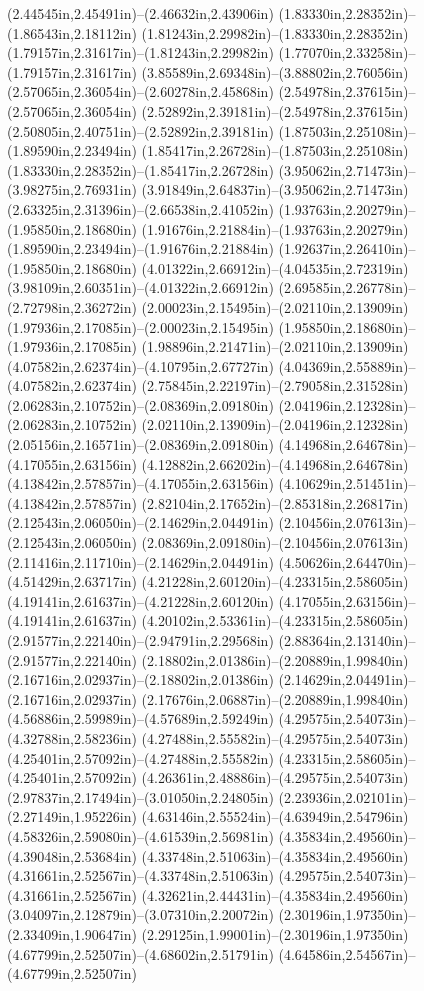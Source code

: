 (2.44545in,2.45491in)--(2.46632in,2.43906in) (1.83330in,2.28352in)--(1.86543in,2.18112in) (1.81243in,2.29982in)--(1.83330in,2.28352in) (1.79157in,2.31617in)--(1.81243in,2.29982in) (1.77070in,2.33258in)--(1.79157in,2.31617in) (3.85589in,2.69348in)--(3.88802in,2.76056in) (2.57065in,2.36054in)--(2.60278in,2.45868in) (2.54978in,2.37615in)--(2.57065in,2.36054in) (2.52892in,2.39181in)--(2.54978in,2.37615in) (2.50805in,2.40751in)--(2.52892in,2.39181in) (1.87503in,2.25108in)--(1.89590in,2.23494in) (1.85417in,2.26728in)--(1.87503in,2.25108in) (1.83330in,2.28352in)--(1.85417in,2.26728in) (3.95062in,2.71473in)--(3.98275in,2.76931in) (3.91849in,2.64837in)--(3.95062in,2.71473in) (2.63325in,2.31396in)--(2.66538in,2.41052in) (1.93763in,2.20279in)--(1.95850in,2.18680in) (1.91676in,2.21884in)--(1.93763in,2.20279in) (1.89590in,2.23494in)--(1.91676in,2.21884in) (1.92637in,2.26410in)--(1.95850in,2.18680in) (4.01322in,2.66912in)--(4.04535in,2.72319in) (3.98109in,2.60351in)--(4.01322in,2.66912in) (2.69585in,2.26778in)--(2.72798in,2.36272in) (2.00023in,2.15495in)--(2.02110in,2.13909in) (1.97936in,2.17085in)--(2.00023in,2.15495in) (1.95850in,2.18680in)--(1.97936in,2.17085in) (1.98896in,2.21471in)--(2.02110in,2.13909in) (4.07582in,2.62374in)--(4.10795in,2.67727in) (4.04369in,2.55889in)--(4.07582in,2.62374in) (2.75845in,2.22197in)--(2.79058in,2.31528in) (2.06283in,2.10752in)--(2.08369in,2.09180in) (2.04196in,2.12328in)--(2.06283in,2.10752in) (2.02110in,2.13909in)--(2.04196in,2.12328in) (2.05156in,2.16571in)--(2.08369in,2.09180in) (4.14968in,2.64678in)--(4.17055in,2.63156in) (4.12882in,2.66202in)--(4.14968in,2.64678in) (4.13842in,2.57857in)--(4.17055in,2.63156in) (4.10629in,2.51451in)--(4.13842in,2.57857in) (2.82104in,2.17652in)--(2.85318in,2.26817in) (2.12543in,2.06050in)--(2.14629in,2.04491in) (2.10456in,2.07613in)--(2.12543in,2.06050in) (2.08369in,2.09180in)--(2.10456in,2.07613in) (2.11416in,2.11710in)--(2.14629in,2.04491in) (4.50626in,2.64470in)--(4.51429in,2.63717in) (4.21228in,2.60120in)--(4.23315in,2.58605in) (4.19141in,2.61637in)--(4.21228in,2.60120in) (4.17055in,2.63156in)--(4.19141in,2.61637in) (4.20102in,2.53361in)--(4.23315in,2.58605in) (2.91577in,2.22140in)--(2.94791in,2.29568in) (2.88364in,2.13140in)--(2.91577in,2.22140in) (2.18802in,2.01386in)--(2.20889in,1.99840in) (2.16716in,2.02937in)--(2.18802in,2.01386in) (2.14629in,2.04491in)--(2.16716in,2.02937in) (2.17676in,2.06887in)--(2.20889in,1.99840in) (4.56886in,2.59989in)--(4.57689in,2.59249in) (4.29575in,2.54073in)--(4.32788in,2.58236in) (4.27488in,2.55582in)--(4.29575in,2.54073in) (4.25401in,2.57092in)--(4.27488in,2.55582in) (4.23315in,2.58605in)--(4.25401in,2.57092in) (4.26361in,2.48886in)--(4.29575in,2.54073in) (2.97837in,2.17494in)--(3.01050in,2.24805in) (2.23936in,2.02101in)--(2.27149in,1.95226in) (4.63146in,2.55524in)--(4.63949in,2.54796in) (4.58326in,2.59080in)--(4.61539in,2.56981in) (4.35834in,2.49560in)--(4.39048in,2.53684in) (4.33748in,2.51063in)--(4.35834in,2.49560in) (4.31661in,2.52567in)--(4.33748in,2.51063in) (4.29575in,2.54073in)--(4.31661in,2.52567in) (4.32621in,2.44431in)--(4.35834in,2.49560in) (3.04097in,2.12879in)--(3.07310in,2.20072in) (2.30196in,1.97350in)--(2.33409in,1.90647in) (2.29125in,1.99001in)--(2.30196in,1.97350in) (4.67799in,2.52507in)--(4.68602in,2.51791in) (4.64586in,2.54567in)--(4.67799in,2.52507in) 